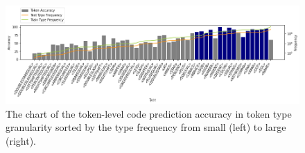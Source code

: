 
\begin{figure}
    \centering
    \includegraphics[width=\textwidth]{figures/pycoder_type_discussion_grammar.png}
    \caption{The chart of the token-level code prediction accuracy in token type granularity sorted by the type frequency from small (left) to large (right).}
    \label{fig:type_barplot}
\end{figure}


